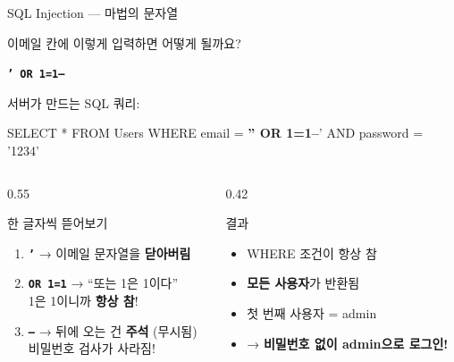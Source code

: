\documentclass[aspectratio=169,10pt]{beamer}
\newcommand{\hlt}[1]{\textcolor{accent}{\textbf{#1}}}
\newcommand{\red}[1]{\textcolor{redTeam}{\textbf{#1}}}
\begin{document}
\begin{frame}[shrink=5]{SQL Injection — 마법의 문자열}

이메일 칸에 이렇게 입력하면 어떻게 될까요?

\vspace{0.3em}
\begin{center}
\Large \texttt{\red{' OR 1=1--}}
\end{center}

\vspace{0.3em}
서버가 만드는 SQL 쿼리:

\vspace{0.3em}
\begin{center}
\colorbox{layer3}{\parbox{0.85\textwidth}{\ttfamily\small
SELECT * FROM Users WHERE email = \red{'' OR 1=1--}' AND password = '1234'
}}
\end{center}

\vspace{0.5em}
\begin{columns}[T]
\begin{column}{0.55\textwidth}
\begin{block}{한 글자씩 뜯어보기}
\begin{enumerate}
    \item \texttt{\red{'}} → 이메일 문자열을 \hlt{닫아버림}
    \item \texttt{\red{OR 1=1}} → ``또는 1은 1이다'' \\
          1은 1이니까 \hlt{항상 참}!
    \item \texttt{\red{--}} → 뒤에 오는 건 \hlt{주석} (무시됨)\\
          비밀번호 검사가 사라짐!
\end{enumerate}
\end{block}
\end{column}
\begin{column}{0.42\textwidth}
\begin{alertblock}{결과}
\begin{itemize}
    \item WHERE 조건이 항상 참
    \item \hlt{모든 사용자}가 반환됨
    \item 첫 번째 사용자 = admin
    \item → \red{비밀번호 없이 admin으로 로그인!}
\end{itemize}
\end{alertblock}
\end{column}
\end{columns}
\end{frame}
\end{document}
